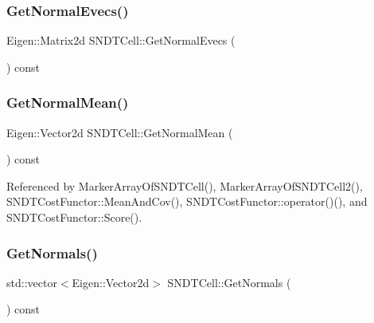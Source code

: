 \mbox{\label{classSNDTCell_a030b5ddd00d4e1aea413081fc52aa5b4}} 
\subsubsection{\texorpdfstring{Get\+Normal\+Evecs()}{GetNormalEvecs()}}
{\footnotesize\ttfamily Eigen\+::\+Matrix2d S\+N\+D\+T\+Cell\+::\+Get\+Normal\+Evecs (\begin{DoxyParamCaption}{ }\end{DoxyParamCaption}) const\hspace{0.3cm}{\ttfamily [inline]}}

\mbox{\label{classSNDTCell_a7d8e809d38f44a7f2d0efe44af390680}} 
\subsubsection{\texorpdfstring{Get\+Normal\+Mean()}{GetNormalMean()}}
{\footnotesize\ttfamily Eigen\+::\+Vector2d S\+N\+D\+T\+Cell\+::\+Get\+Normal\+Mean (\begin{DoxyParamCaption}{ }\end{DoxyParamCaption}) const\hspace{0.3cm}{\ttfamily [inline]}}



Referenced by Marker\+Array\+Of\+S\+N\+D\+T\+Cell(), Marker\+Array\+Of\+S\+N\+D\+T\+Cell2(), S\+N\+D\+T\+Cost\+Functor\+::\+Mean\+And\+Cov(), S\+N\+D\+T\+Cost\+Functor\+::operator()(), and S\+N\+D\+T\+Cost\+Functor\+::\+Score().

\mbox{\label{classSNDTCell_ad8fbc8a667577b4c3d8c697f4fe6187b}} 
\subsubsection{\texorpdfstring{Get\+Normals()}{GetNormals()}}
{\footnotesize\ttfamily std\+::vector$<$Eigen\+::\+Vector2d$>$ S\+N\+D\+T\+Cell\+::\+Get\+Normals (\begin{DoxyParamCaption}{ }\end{DoxyParamCaption}) const\hspace{0.3cm}{\ttfamily [inline]}}

